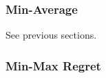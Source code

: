 \documentclass{article}
\newtheorem{theorem}{Theorem}
\begin{document}




\subsubsection{Min-Average}

See previous sections.

\subsubsection{Min-Max Regret}
\end{document}

